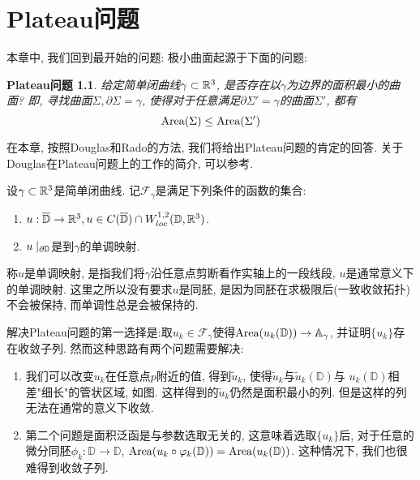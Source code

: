 \chapter{Plateau问题}
\newcommand{\FG}{{\mathcal{F}_\gamma}}
\newcommand{\AG}{{\mathbb{A}_\gamma}}
\renewcommand{\EG}{{\mathbb{E}_\gamma}}
\renewcommand{\E}{{E}}
\renewcommand{\D}{{\mathbb{D}}}
\newtheorem*{plateauproblem*}{Plateau问题}
本章中, 我们回到最开始的问题:
极小曲面起源于下面的问题:
\begin{plateauproblem*}\label{plateau}
    给定简单闭曲线$\gamma \subset \mathbb{R}^3$, 是否存在以$\gamma$为边界的面积最小的曲面? 即, 寻找曲面$\Sigma, \partial \Sigma = \gamma$, 使得对于任意满足$\partial \Sigma' = \gamma$的曲面$\Sigma'$, 都有
    \begin{equation*}
        \text{Area}(\Sigma) \le \text{Area}(\Sigma')
    \end{equation*}
\end{plateauproblem*}
在本章, 按照Douglas和Rado的方法, 我们将给出Plateau问题的肯定的回答. 关于Douglas在Plateau问题上的工作的简介, 可以参考\cite{WorkofDouglas}.
\par 设$\gamma \subset \mathbb{R}^3$是简单闭曲线. 记$\FG$是满足下列条件的函数的集合:
\begin{enumerate}
    \item $u: \overline{\D} \to \R^3, u\in C(\overline{\D})\cap W_{loc}^{1,2}(\D,\R^3)$.
    \item $u\mid_{\P \D}$是到$\gamma$的单调映射.
\end{enumerate}
\begin{remark}
    称$u$是单调映射, 是指我们将$\gamma$沿任意点剪断看作实轴上的一段线段,  $u$是通常意义下的单调映射.  这里之所以没有要求$u$是同胚, 是因为同胚在求极限后(一致收敛拓扑)不会被保持,  而单调性总是会被保持的. 
\end{remark}
解决Plateau问题的第一选择是:取$u_k \in \FG$使得$\Area(u_k(\D)) \to \AG$, 并证明$\{u_k\}$存在收敛子列. 然而这种思路有两个问题需要解决:
\begin{enumerate}
    \item 我们可以改变$u_k$在任意点$p$附近的值, 得到$\tilde{u}_k$, 使得$\tilde{u}_k$与$\tilde{u}_k(\mathbb{D})$与 $u_k(\D)$相差"细长"的管状区域, 如图. 这样得到的$\tilde{u}_k$仍然是面积最小的列. 但是这样的列无法在通常的意义下收敛. 
    \item 第二个问题是面积泛函是与参数选取无关的, 这意味着选取$\{u_k\}$后, 对于任意的微分同胚$\phi_k: \D \to \D$, $\Area(u_k\circ \phi_k(\D))= \Area(u_k(\D))$. 这种情况下, 我们也很难得到收敛子列.
\end{enumerate}
